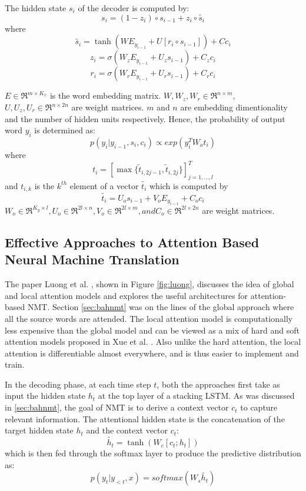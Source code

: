 \documentclass{article}
\begin{document}
	The hidden state \(s_i\) of the decoder is computed by:
	\[s_i = (1-{z_i}) \circ {s}_{i-1} + {z_i} \circ {\widetilde{s_i}}\]
	where
	\[\widetilde{s_i} = \tanh(WE_{y_{i-1}} + U[{r_i} \circ {s}_{i-1}]) + Cc_i\] 
	\[z_i = \sigma({W}_zE_{y_{i-1}} + {U}_z{s}_{i-1}) + C_zc_i\]
	\[{r_i} = \sigma({W_r}E_{y_{i-1}} + {U_r}{s}_{i-1}) + C_rc_i\]
	
	\(E \in \Re^{m \times K_x}\) is the word embedding matrix. \({W}, {W_z}, {W_r} \in \Re^{n \times m}\), \({U}, {U_z}, {U_r} \in \Re^{n \times 2n}\) are weight matrices. \(m\) and \(n\) are embedding dimentionality and the number of hidden units respectively. Hence, the probability of output word \(y_i\) is determined as:
	\[p(y_i | y_{i-1}, s_i, c_i) \propto exp(y_i^TW_ot_i)\]
	where
	\[t_i = [\max \{\widetilde{t}_{i,2j-1}, \widetilde{t}_{i,2j}\}]^T_{j = 1,..., l}\]
	and \(t_{i,k}\) is the \(k^{th}\) element of a vector \(\widetilde{t_i}\) which is computed by
	\[\widetilde{t_i} = U_os_{i-1} + V_oE_{y_{i-1}} + C_oc_i \]
	\(W_o \in \Re^{K_y \times l}, U_o \in \Re^{2l \times n}, V_o \in \Re^{2l \times m}, and C_o \in \Re^{2l \times 2n}\) are weight matrices.
	
\subsection{Effective Approaches to Attention Based Neural Machine Translation}
\label{luongatn}

	The paper Luong et al. \cite{luongatn}, shown in Figure \ref{fig:luong}, discusses the idea of global and local attention models and explores the useful architectures for attention-based NMT. Section \ref{sec:bahnmt} was on the lines of the global approach where all the source words are attended. The local attention model is computationally less expensive than the global model and can be viewed as a mix of hard and soft attention models proposed in Xue et al. \cite{xuatn}. Also unlike the hard attention, the local attention is differentiable almost everywhere, and is thus easier to implement and train.
	
	In the decoding phase, at each time step \(t\), both the approaches first take as input the hidden state \(h_t\) at the top layer of a stacking LSTM. As was discussed in \ref{sec:bahnmt}, the goal of NMT is to derive a context vector \(c_t\) to capture relevant information. The attentional hidden state is the concatenation of the target hidden state \(h_t\) and the context vector \(c_t\):
	\[\widetilde{h_t} = \tanh(W_c[c_t;h_t])\]
	which is then fed through the softmax layer to produce the predictive distribution as:
	\[p(y_t | y_{<t}, x) = softmax(W_s\widetilde{h_t})\]
	
\end{document}
